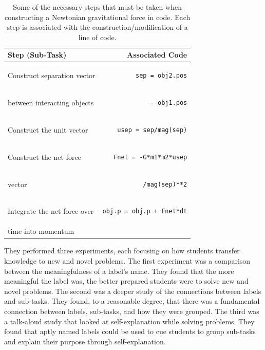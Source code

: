 \documentclass{msuphddissertation}
\begin{document}
\begin{doublespace}
\begin{table}[hb]\centering
\begin{tabular}{lr}\hline\hline
Step (Sub-Task) & Associated Code \\\hline
Construct separation vector & \begin{lstlisting}
sep = obj2.pos
\end{lstlisting}\\
between interacting objects & \begin{lstlisting}
         - obj1.pos
\end{lstlisting}\\\hline
Construct the unit vector & \begin{lstlisting}
usep = sep/mag(sep)
\end{lstlisting}\\\hline
Construct the net force & \begin{lstlisting}
Fnet = -G*m1*m2*usep
\end{lstlisting}\\
vector & \begin{lstlisting}
         /mag(sep)**2
\end{lstlisting}\\\hline
Integrate the net force over & \begin{lstlisting}
obj.p = obj.p + Fnet*dt
\end{lstlisting}\\
time into momentum & \\\hline\hline
\end{tabular}\caption{Some of the necessary steps that must be taken when constructing a Newtonian gravitational force in code.  Each step is associated with the construction/modification of a line of code.\label{CH3:TaskAnalysis}}
\end{table}

They performed three experiments, each focusing on how students transfer knowledge to new and novel problems.  The first experiment was a comparison between the meaningfulness of a label's name.  They found that the more meaningful the label was, the better prepared students were to solve new and novel problems.  The second was a deeper study of the connections between labels and sub-tasks.  They found, to a reasonable degree, that there was a fundamental connection between labels, sub-tasks, and how they were grouped.  The third was a talk-aloud study that looked at self-explanation while solving problems.  They found that aptly named labels could be used to cue students to group sub-tasks and explain their purpose through self-explanation.


\end{doublespace}
\end{document}
